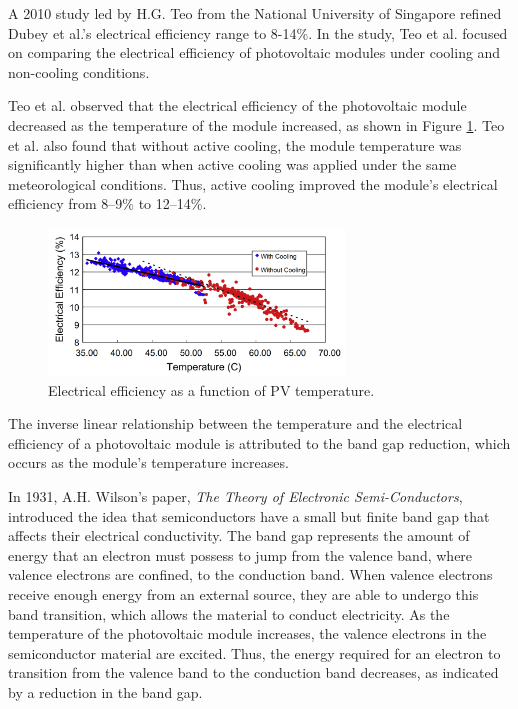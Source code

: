 A 2010 study led by H.G. Teo from the National University of Singapore refined Dubey et al.'s electrical efficiency range to 8-14\%. In the study, Teo et al. focused on comparing the electrical efficiency of photovoltaic modules under cooling and non-cooling conditions.\vspace{0.5em}

Teo et al. observed that the electrical efficiency of the photovoltaic module decreased as the temperature of the module increased, as shown in Figure \ref{fig:electrical_efficiency_vs_temperature_pv_module}. Teo et al. also found that without active cooling, the module temperature was significantly higher than when active cooling was applied under the same meteorological conditions. Thus, active cooling improved the module’s electrical efficiency from 8–9\% to 12–14\%. \cite{Teo2012AnModules}

\begin{figure}[ht]
    \centering
    \includegraphics[width=0.7\textwidth]{Figures/electrical_efficiency_vs_temperature_pv_module.png}
    \caption{Electrical efficiency as a function of PV temperature. \cite{Teo2012AnModules}}
    \label{fig:electrical_efficiency_vs_temperature_pv_module}
\end{figure}
\FloatBarrier

The inverse linear relationship between the temperature and the electrical efficiency of a photovoltaic module is attributed to the band gap reduction, which occurs as the module's temperature increases.\vspace{0.5em}

In 1931, A.H. Wilson's paper, \textit{The Theory of Electronic Semi-Conductors}, introduced the idea that semiconductors have a small but finite band gap that affects their electrical conductivity. \cite{Il1931TheSemi-Conductors} The band gap represents the amount of energy that an electron must possess to jump from the valence band, where valence electrons are confined, to the conduction band. When valence electrons receive enough energy from an external source, they are able to undergo this band transition, which allows the material to conduct electricity. \cite{CircuitBread2018BandElectronics} As the temperature of the photovoltaic module increases, the valence electrons in the semiconductor material are excited. Thus, the energy required for an electron to transition from the valence band to the conduction band decreases, as indicated by a reduction in the band gap. \cite{Renewable_Tek2025HOTExplained}\vspace{0.5em}

